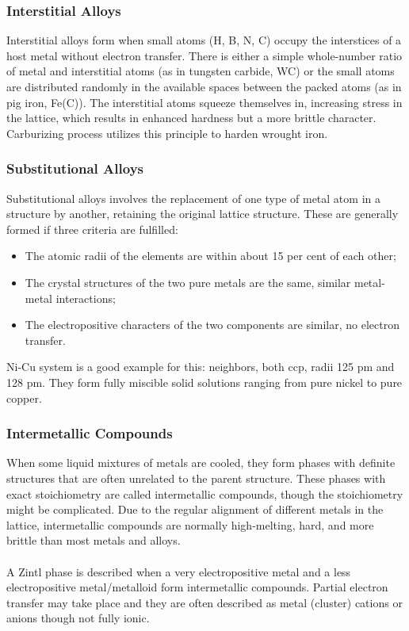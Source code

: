 \subsubsection{Interstitial Alloys}
%
Interstitial alloys form when small atoms (H, B, N, C) occupy the interstices of a host metal without electron transfer. 
There is either a simple whole-number ratio of metal and interstitial atoms (as in tungsten carbide, WC) 
or the small atoms are distributed randomly in the available spaces between the packed atoms (as in pig iron, Fe(C)).
The interstitial atoms squeeze themselves in, increasing stress in the lattice, 
which results in enhanced hardness but a more brittle character.\\
Carburizing process utilizes this principle to harden wrought iron.
%
\subsubsection{Substitutional Alloys}
%
Substitutional alloys involves the replacement of one type of metal atom in a structure by another, 
retaining the original lattice structure. These are generally formed if three criteria are fulfilled:
%
\begin{itemize}
	\item The atomic radii of the elements are within about 15 per cent of each other;
	\item The crystal structures of the two pure metals are the same, similar metal-metal interactions;
	\item The electropositive characters of the two components are similar, no electron transfer.
\end{itemize}
%
Ni-Cu system is a good example for this: neighbors, both ccp, radii 125 pm and 128 pm.
They form fully miscible solid solutions ranging from pure nickel to pure copper.
%
\subsubsection{Intermetallic Compounds}
%
When some liquid mixtures of metals are cooled, 
they form phases with definite structures that are often unrelated to the parent structure. 
These phases with exact stoichiometry are called intermetallic compounds, though the stoichiometry might be complicated.
Due to the regular alignment of different metals in the lattice, 
intermetallic compounds are normally high-melting, hard, and more brittle than most metals and alloys.\\ \\
%
A Zintl phase is described when a very electropositive metal and a less electropositive metal/metalloid form intermetallic compounds.
Partial electron transfer may take place and they are often described as metal (cluster) cations or anions though not fully ionic.
%
